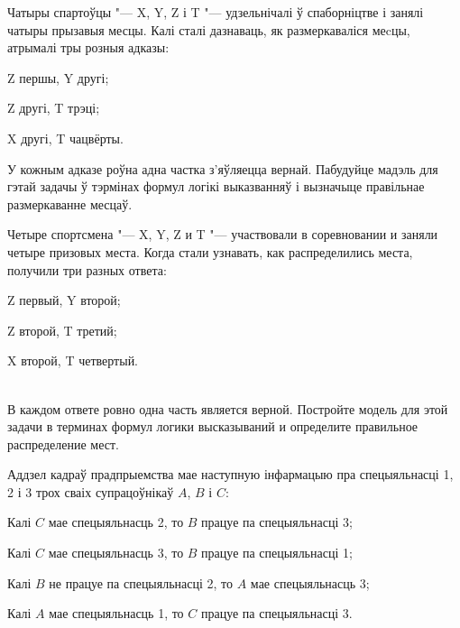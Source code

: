 \begin{problemList}
\bigskip

\problemItemSimple
{Чатыры спартоўцы "--- X, Y, Z і T "--- удзельнічалі ў спаборніцтве і занялі чатыры прызавыя месцы. Калі сталі дазнаваць, як размеркаваліся меcцы, атрымалі тры розныя адказы:
\begin{belarusianEnumerate}
    \item Z першы, Y другі;
    \item Z другі, T трэці;
    \item X другі, T чацвёрты.
\end{belarusianEnumerate}

У кожным адказе роўна адна частка з'яўляецца вернай. Пабудуйце мадэль для гэтай задачы ў тэрмінах формул логікі выказванняў і вызначыце правільнае размеркаванне месцаў.}
{Четыре спортсмена "--- X, Y, Z и T "--- участвовали в соревновании и заняли четыре призовых места. Когда стали узнавать, как распределились места, получили три разных ответа:
\begin{russianEnumerate}
    \item Z первый, Y второй;
    \item Z второй, T третий;
    \item X второй, T четвертый.
\end{russianEnumerate}\\
В каждом ответе ровно одна часть является верной. Постройте модель для этой задачи в терминах формул логики высказываний и определите правильное распределение мест.}

\bigskip

\problemItemSimple
{Аддзел кадраў прадпрыемства мае наступную інфармацыю пра спецыяльнасці 1, 2 і 3 трох сваіх супрацоўнікаў $A$, $B$ і $C$:
\begin{belarusianEnumerate}
    \item Калі $C$ мае спецыяльнасць 2, то $B$ працуе па спецыяльнасці 3;
    \item Калі $C$ мае спецыяльнасць 3, то $B$ працуе па спецыяльнасці 1;
    \item Калі $B$ не працуе па спецыяльнасці 2, то $A$ мае спецыяльнасць 3;
    \item Калі $A$ мае спецыяльнасць 1, то $C$ працуе па спецыяльнасці 3.
\end{belarusianEnumerate}

}
\end{problemList}
